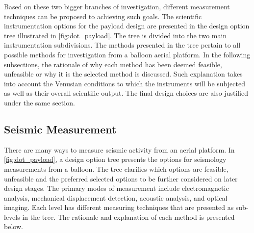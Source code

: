 Based on these two bigger branches of investigation, different measurement techniques can be proposed to achieving such goals. The scientific instrumentation options for the payload design are presented in the design option tree illustrated in \autoref{fig:dot_payload}. The tree is divided into the two main instrumentation subdivisions. The methods presented in the tree pertain to all possible methods for investigation from a balloon aerial platform. In the following subsections, the rationale of why each method has been deemed feasible, unfeasible or why it is the selected method is discussed. Such explanation takes into account the Venusian conditions to which the instruments will be subjected as well as their overall scientific output. The final design choices are also justified under the same section.

% 




\subsection{Seismic Measurement}

There are many ways to measure seismic activity from an aerial platform. In \autoref{fig:dot_payload}, a design option tree presents the options for seismology measurements from a balloon. The tree clarifies which options are feasible, unfeasible and the preferred selected options to be further considered on later design stages. The primary modes of measurement include electromagnetic analysis, mechanical displacement detection, acoustic analysis, and optical imaging. Each level has different measuring techniques that are presented as sub-levels in the tree. The rationale and explanation of each method is presented below. 

